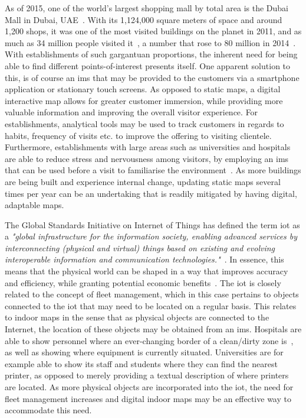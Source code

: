 As of 2015, one of the world's largest shopping mall by total area is the Dubai Mall in Dubai, UAE~\cite{aleksandarjevtic2015}. With its 1,124,000 square meters of space and around 1,200 shops, it was one of the most visited buildings on the planet in 2011, and as much as 34 million people visited it~\cite{anderson2012evolution}, a number that rose to 80 million in 2014~\cite{marysophia2015}. With establishments of such gargantuan proportions, the inherent need for being able to find different points-of-interest presents itself. One apparent solution to this, is of course an \gls{ims} that may be provided to the customers via a smartphone application or stationary touch screens. As opposed to static maps, a digital interactive map allows for greater customer immersion, while providing more valuable information and improving the overall visitor experience. For establishments, analytical tools may be used to track customers in regards to habits, frequency of visits etc. to improve the offering to visiting clientele. Furthermore, establishments with large areas such as universities and hospitals are able to reduce stress and nervousness among visitors, by employing an \gls{ims} that can be used before a visit to familiarise the environment~\cite{mazemaphosp}. As more buildings are being built and experience internal change, updating static maps several times per year can be an undertaking that is readily mitigated by having digital, adaptable maps.


The Global Standards Initiative on Internet of Things has defined the term \gls{iot} as a \textit{"global infrastructure for the information society, enabling advanced services by interconnecting (physical and virtual) things based on existing and evolving interoperable information and communication technologies."}~\cite{itu2016}. In essence, this means that the physical world can be shaped in a way that improves accuracy and efficiency, while granting potential economic benefits~\cite{friess2013internet}. The \gls{iot} is closely related to the concept of fleet management, which in this case pertains to objects connected to the \gls{iot} that may need to be located on a regular basis. This relates to indoor maps in the sense that as physical objects are connected to the Internet, the location of these objects may be obtained from an \gls{ims}. Hospitals are able to show personnel where an ever-changing border of a clean/dirty zone is~\cite{hambraeus1978bacterial}, as well as showing where equipment is currently situated. Universities are for example able to show its staff and students where they can find the nearest printer, as opposed to merely providing a textual description of where printers are located. As more physical objects are incorporated into the \gls{iot}, the need for fleet management increases and digital indoor maps may be an effective way to accommodate this need. 

